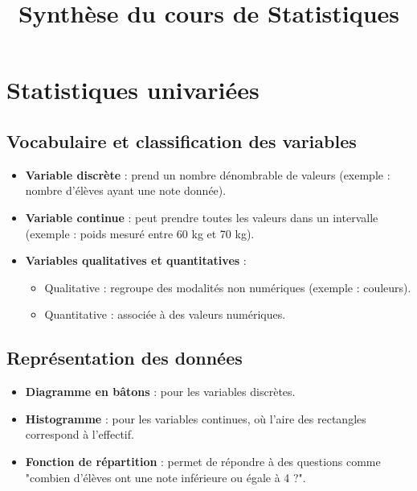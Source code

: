 \documentclass{article}
\begin{document}
\title{Synthèse du cours de Statistiques}
\author{}
\date{}
\maketitle

\section*{Statistiques univariées}

\subsection*{Vocabulaire et classification des variables}
\begin{itemize}
    \item \textbf{Variable discrète} : prend un nombre dénombrable de valeurs (exemple : nombre d’élèves ayant une note donnée).
    \item \textbf{Variable continue} : peut prendre toutes les valeurs dans un intervalle (exemple : poids mesuré entre 60 kg et 70 kg).
    \item \textbf{Variables qualitatives et quantitatives} : 
    \begin{itemize}
        \item Qualitative : regroupe des modalités non numériques (exemple : couleurs).
        \item Quantitative : associée à des valeurs numériques.
    \end{itemize}
\end{itemize}

\subsection*{Représentation des données}
\begin{itemize}
    \item \textbf{Diagramme en bâtons} : pour les variables discrètes.
    \item \textbf{Histogramme} : pour les variables continues, où l’aire des rectangles correspond à l’effectif.
    \item \textbf{Fonction de répartition} : permet de répondre à des questions comme "combien d’élèves ont une note inférieure ou égale à 4 ?".
\end{itemize}
\end{document}
